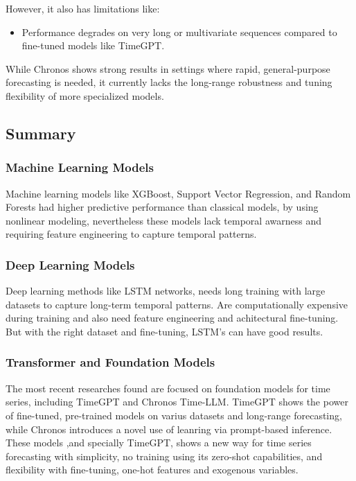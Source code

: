 \documentclass{article}
\begin{document}
However, it also has limitations like:

\begin{itemize}
    \item Performance degrades on very long or multivariate sequences compared to fine-tuned models like TimeGPT.
\end{itemize}

While Chronos shows strong results in settings where rapid, general-purpose forecasting is needed, it currently lacks the long-range robustness and tuning flexibility of more specialized models.

\subsection{Summary}
\subsubsection{Machine Learning Models}
Machine learning models like XGBoost, Support Vector Regression, and Random Forests had higher predictive performance than classical models, by using nonlinear modeling, nevertheless these models lack temporal awarness and requiring feature engineering to capture temporal patterns.

\subsubsection{Deep Learning Models}
Deep learning methods like LSTM networks, needs long training with large datasets to capture long-term temporal patterns. Are computationally expensive during training and also need feature engineering and achitectural fine-tuning. But with the right dataset and fine-tuning, LSTM's can have good results.

\subsubsection{Transformer and Foundation Models}
The most recent researches found are focused on foundation models for time series, including TimeGPT and Chronos Time-LLM. TimeGPT shows the power of fine-tuned, pre-trained models on varius datasets and long-range forecasting, while Chronos introduces a novel use of leanring via prompt-based inference. These models ,and specially TimeGPT, shows a new way for time series forecasting with simplicity, no training using its zero-shot capabilities, and flexibility with fine-tuning, one-hot
features and exogenous variables.
\end{document}
